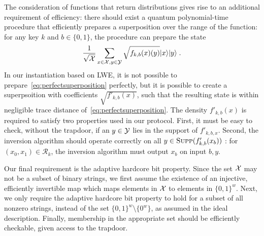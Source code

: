 The consideration of functions that return distributions gives rise to an additional requirement of efficiency: there should exist a quantum polynomial-time procedure that efficiently prepares a superposition over the range of the function: for any key $k$ and $b\in\{0,1\}$, the procedure can prepare the state
\begin{equation}\label{eq:perfectsuperposition}
\frac{1}{\sqrt{\mathcal{X}}}\sum_{x\in \mathcal{X}, y\in \mathcal{Y}}\sqrt{f_{k,b}(x)(y)}|x\rangle|y\rangle\;.
\end{equation}
In our instantiation based on LWE, it is not possible to prepare~\eqref{eq:perfectsuperposition} perfectly, but it is possible to create a superpsoition with coefficients $\sqrt{f'_{k,b}(x)}$, such that the resulting state is within negligible trace distance of~\eqref{eq:perfectsuperposition}. The density $f'_{k,b}(x)$ is required to satisfy two properties used in our protocol. First, it must be easy to check, without the trapdoor, if an $y\in \mathcal{Y}$ lies in the support of $f'_{k,b,x}$. Second, the inversion algorithm should operate correctly on all $y\in\textsc{Supp} (f'_{k,b}(x_b))$ : for $(x_0,x_1)\in\mathcal{R}_k$, the inversion algorithm must output $x_b$ on input $b,y$.

Our final requirement is the adaptive hardcore bit property. Since the set $\mathcal{X}$ may not be a subset of binary strings, we first assume the existence of an injective, efficiently invertible map which maps elements in $\mathcal{X}$ to elements in $\{0,1\}^w$. Next, we only require the adaptive hardcore bit property to hold for a subset of all nonzero strings, instead of the  set $\{0,1\}^w\setminus \{0^w\}$, as assumed in the ideal description. Finally, membership in the appropriate set should be efficiently checkable, given access to the trapdoor. 



